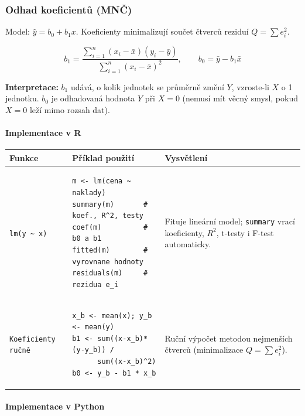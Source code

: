 \documentclass[a4paper, 11pt]{article}
\newenvironment{funkcedict}
{%
  \begingroup
  \renewcommand{\arraystretch}{1.4}%
  \lstset{basicstyle=\ttfamily\small, columns=fullflexible}%
  \setlength{\tabcolsep}{4pt}%
  \begin{tabular}{p{0.19\textwidth} p{0.38\textwidth} p{0.30\textwidth}}
  \textbf{Funkce} & \textbf{Příklad použití} & \textbf{Vysvětlení} \\
  \midrule
}
{%
  \end{tabular}%
  \endgroup
}
\begin{document}
\subsubsection{Odhad koeficientů (MNČ)}

Model: $\hat{y} = b_0 + b_1 x$. Koeficienty minimalizují součet čtverců reziduí $Q = \sum e_i^2$.

\begin{equation*}
	b_1 = \frac{\sum_{i=1}^n (x_i - \bar{x})(y_i - \bar{y})}{\sum_{i=1}^n (x_i - \bar{x})^2}, \qquad b_0 = \bar{y} - b_1 \bar{x}
\end{equation*}

\textbf{Interpretace:} $b_1$ udává, o kolik jednotek se průměrně změní $Y$, vzroste-li $X$ o 1 jednotku.
$b_0$ je odhadovaná hodnota $Y$ při $X = 0$ (nemusí mít věcný smysl, pokud $X = 0$ leží mimo rozsah dat).

\paragraph{Implementace v R}\mbox{}\par

\begin{funkcedict}

	\texttt{lm(y \textasciitilde\ x)} &
	\begin{lstlisting}
m <- lm(cena ~ naklady)
summary(m)       # koef., R^2, testy
coef(m)          # b0 a b1
fitted(m)        # vyrovnane hodnoty
residuals(m)     # rezidua e_i
	\end{lstlisting}
	&
	Fituje lineární model; \texttt{summary} vrací koeficienty, $R^2$, t-testy i F-test automaticky. \\

	\texttt{Koeficienty ručně} &
	\begin{lstlisting}
x_b <- mean(x); y_b <- mean(y)
b1 <- sum((x-x_b)*(y-y_b)) /
      sum((x-x_b)^2)
b0 <- y_b - b1 * x_b
	\end{lstlisting}
	&
	Ruční výpočet metodou nejmenších čtverců (minimalizace $Q = \sum e_i^2$). \\

\end{funkcedict}

\paragraph{Implementace v Python}\mbox{}\par
\end{document}
